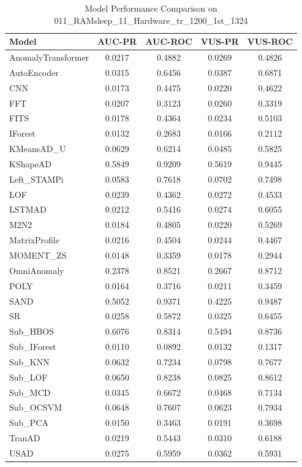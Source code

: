 \documentclass[12pt,oneside]{article}
\begin{document}
\begin{table}[htbp]
    \centering
    \caption{Model Performance Comparison on 011\_RAMsleep\_11\_Hardware\_tr\_1200\_1st\_1324}
    \begin{tabular}{|l|c|c|c|c|}
        \toprule
        \textbf{Model} & \textbf{AUC-PR} & \textbf{AUC-ROC} & \textbf{VUS-PR} & \textbf{VUS-ROC} \\
        \midrule
        AnomalyTransformer & 0.0217 & 0.4882 & 0.0269 & 0.4826 \\
        AutoEncoder & 0.0315 & 0.6456 & 0.0387 & 0.6871 \\
        CNN & 0.0173 & 0.4475 & 0.0220 & 0.4622 \\
        FFT & 0.0207 & 0.3123 & 0.0260 & 0.3319 \\
        FITS & 0.0178 & 0.4364 & 0.0234 & 0.5103 \\
        IForest & 0.0132 & 0.2683 & 0.0166 & 0.2112 \\
        KMeansAD\_U & 0.0629 & 0.6214 & 0.0485 & 0.5825 \\
        KShapeAD & 0.5849 & 0.9209 & 0.5619 & 0.9445 \\
        Left\_STAMPi & 0.0583 & 0.7618 & 0.0702 & 0.7498 \\
        LOF & 0.0239 & 0.4362 & 0.0272 & 0.4533 \\
        LSTMAD & 0.0212 & 0.5416 & 0.0274 & 0.6055 \\
        M2N2 & 0.0184 & 0.4805 & 0.0220 & 0.5269 \\
        MatrixProfile & 0.0216 & 0.4504 & 0.0244 & 0.4467 \\
        MOMENT\_ZS & 0.0148 & 0.3359 & 0.0178 & 0.2944 \\
        OmniAnomaly & 0.2378 & 0.8521 & 0.2667 & 0.8712 \\
        POLY & 0.0164 & 0.3716 & 0.0211 & 0.3459 \\
        SAND & 0.5052 & 0.9371 & 0.4225 & 0.9487 \\
        SR & 0.0258 & 0.5872 & 0.0325 & 0.6455 \\
        Sub\_HBOS & 0.6076 & 0.8314 & 0.5494 & 0.8736 \\
        Sub\_IForest & 0.0110 & 0.0892 & 0.0132 & 0.1317 \\
        Sub\_KNN & 0.0632 & 0.7234 & 0.0798 & 0.7677 \\
        Sub\_LOF & 0.0650 & 0.8238 & 0.0825 & 0.8612 \\
        Sub\_MCD & 0.0345 & 0.6672 & 0.0468 & 0.7134 \\
        Sub\_OCSVM & 0.0648 & 0.7607 & 0.0623 & 0.7934 \\
        Sub\_PCA & 0.0150 & 0.3463 & 0.0191 & 0.3698 \\
        TranAD & 0.0219 & 0.5443 & 0.0310 & 0.6188 \\
        USAD & 0.0275 & 0.5959 & 0.0362 & 0.5931 \\
        \bottomrule
    \end{tabular}
    
    \label{tab:model_performance_RAMsleep}
\end{table}
\end{document}
